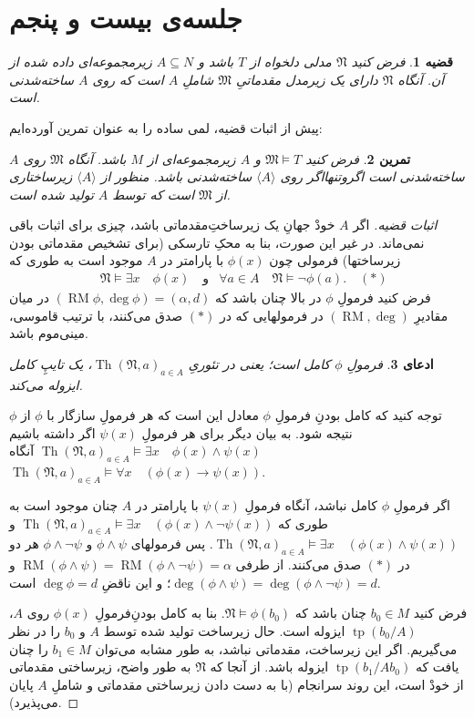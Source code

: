 \documentclass[12pt,a4paper]{report}
\theoremstyle{colorhead}
\newtheorem{thm}{قضیه}
\newtheorem{tam}[thm]{تمرین}
\newtheorem{claim}[thm]{ادعای}
\DeclareMathOperator{\Th}{Th}
\DeclareMathOperator{\RM}{RM}
\DeclareMathOperator{\tp}{tp}
\begin{document}
\section{	جلسه‌ی بیست و پنجم}
\begin{thm}
فرض کنید
$\mathfrak{N}$
مدلی دلخواه از
$T$
باشد و 
$A\subseteq N$
زیرمجموعه‌ای داده شده از آن. آنگاه 
$\mathfrak{N}$
دارای یک زیرمدل مقدماتیِ 
$\mathfrak{M}$
شاملِ
$A$
است که روی
$A$
ساخته‌شدنی است. 
\end{thm}
پیش از اثبات قضیه، لمی ساده را به عنوان تمرین آورده‌ایم:
\begin{tam}
فرض کنید
$\mathfrak{M}\models T$
و
$A$
زیرمجموعه‌ای از
$M$
باشد. آنگاه
$\mathfrak{M}$
روی
$A$
ساخته‌شدنی است اگروتنهااگر روی
$\langle A\rangle$
ساخته‌شدنی باشد. منظور از
$\langle A\rangle$
زیرساختاری از
$\mathfrak{M}$
است که توسط 
$A$
تولید شده است. 
\end{tam}
\begin{proof}[اثبات قضیه]
اگر
$A$
خودْ جهانِ یک زیرساختِ‌مقدماتی باشد، چیزی برای اثبات باقی نمی‌ماند. در غیر این صورت، بنا به محکِ تارسکی (برای تشخیص مقدماتی بودن زیرساختها)
فرمولی چون
$\phi(x)$
با پارامتر در
$A$
موجود است به طوری که
\begin{align*}
& \mathfrak{N}\models \exists x\quad \phi(x)\quad  \text{و}
& \forall a\in A \quad \mathfrak{N}\models \neg \phi(a). \quad (*)
\end{align*}
فرض کنید
فرمولِ
$\phi$
در بالا چنان باشد که 	
$(\RM\phi, \deg \phi)=(\alpha
,d)$
در میان 
مقادیرِ
$(\RM,\deg)$
در
فرمولهایی که در
$(*)$
صدق می‌کنند، با ترتیب قاموسی، مینی‌موم باشد. 
\begin{claim}
فرمولِ
$\phi$
کامل است؛ یعنی  در تئوریِ
$\Th(\mathfrak{N},a)_{a\in A}$،
یک تایپِ کامل ایزوله می‌کند. 
\end{claim}
توجه کنید که کامل بودنِ فرمولِ
$\phi$
معادل این است که هر فرمولِ
سازگار با
$\phi$
از  
$\phi$
نتیجه شود. به بیان دیگر  برای هر فرمولِ
$\psi(x)$
اگر داشته باشیم
$\Th(\mathfrak{N},a)_{a\in A}\models \exists x\quad \phi(x)\wedge \psi(x)$
آنگاه
$\Th(\mathfrak{N},a)_{a\in A}\models \forall x\quad (\phi(x)\to \psi(x))$.
\par 
اگر فرمولِ
$\phi$
کامل نباشد، آنگاه فرمولِ
$\psi(x)$
با پارامتر در
$A$
چنان موجود است به طوری که
$\Th(\mathfrak{N},a)_{a\in A}\models \exists x\quad (\phi(x)\wedge \neg \psi(x))$
و
\mbox{$\Th(\mathfrak{N},a)_{a\in A}\models \exists x\quad (\phi(x)\wedge \psi(x))$}.
پس
فرمولهای
$\phi\wedge\psi$
و
$\phi\wedge\neg \psi$
هر دو در 
$(*)$
صدق می‌کنند.
از طرفی
\mbox{$\RM(\phi\wedge \psi)=\RM(\phi\wedge \neg \psi)=\alpha$}
و
$\deg(\phi\wedge \psi)=\deg (\phi\wedge \neg \psi)=d$؛
و
این ناقضِ
$\deg \phi=d$
است. 
\par 
 فرض کنید
$b_0\in M$
چنان باشد که
\mbox{$\mathfrak{N}\models \phi(b_0)$}.
بنا به کامل بودنِ‌فرمولِ
$\phi(x)$
روی
$A$،
$\tp(b_0/A)$
ایزوله است. حال زیرساخت تولید شده توسط
$A$
و
$b_0$
را در نظر می‌گیریم. اگر این زیرساخت، مقدماتی نباشد، به طور مشابه می‌توان 
$b_1\in M$
را چنان یافت که 
$\tp(b_1/Ab_0)$
ایزوله باشد. از آنجا که
$\mathfrak{N}$
به طور واضح، زیرساختی مقدماتی از خودْ است، این روند سرانجام 
(با به دست دادن زیرساختی مقدماتی و شاملِ
$A$
پایان می‌پذیرد).
\end{proof}
\end{document}
